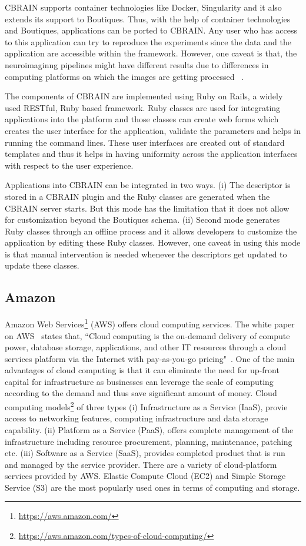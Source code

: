 CBRAIN supports container technologies like Docker, Singularity and it also extends its support to Boutiques. Thus, with the help of container technologies and Boutiques, applications can be ported to CBRAIN. Any user who has access to this application can try to reproduce the experiments since the data and the application are accessible within the framework. However, one caveat is that, the neuroimaginng pipelines might have different results due to differences in computing platforms on which the images are getting processed ~\cite{10.3389/conf.fninf.2014.18.00076}.

The components of CBRAIN are implemented using Ruby on Rails, a widely used RESTful, Ruby based framework. Ruby classes are used for integrating applications into the platform and those classes can create web forms which creates the user interface for the application, validate the parameters and helps in running the command lines. These user interfaces are created out of standard templates and thus it helps in having uniformity across the application interfaces with respect to the user experience.

Applications into CBRAIN can be integrated in two ways. (i) The descriptor is stored in a CBRAIN plugin and the Ruby classes are generated when the CBRAIN server starts. But this mode has the limitation that it does not allow for customization beyond the Boutiques schema. (ii) Second mode generates Ruby classes through an offline process and it allows developers to customize the application by editing these Ruby classes. However, one caveat in using this mode is that manual intervention is needed whenever the descriptors get updated to update these classes.

\subsection{Amazon}
Amazon Web Services\footnote{\url{https://aws.amazon.com/}} (AWS) offers cloud computing services. The white paper on AWS~\cite{Amazon-Web-Services} states that, ``Cloud computing is the on-demand delivery of compute power, database storage, applications, and other IT resources through a cloud services platform via the Internet with pay-as-you-go pricing"~\cite{Amazon-Web-Services}. One of the main advantages of cloud computing is that it can eliminate the need for up-front capital for infrastructure as businesses can leverage the scale of computing according to the demand and thus save significant amount of money. Cloud computing models\footnote{\url{https://aws.amazon.com/types-of-cloud-computing/}} of three types (i) Infrastructure as a Service (IaaS), provie access to networking features, computing infrastructure and data storage capability. (ii) Platform as a Service (PaaS), offers complete management of the infrastructure including resource procurement, planning, maintenance, patching etc. (iii) Software as a Service (SaaS), provides completed product that is run and managed by the service provider. There are a variety of cloud-platform services provided by AWS. Elastic Compute Cloud (EC2) and Simple Storage Service (S3) are the most popularly used ones in terms of computing and storage.

